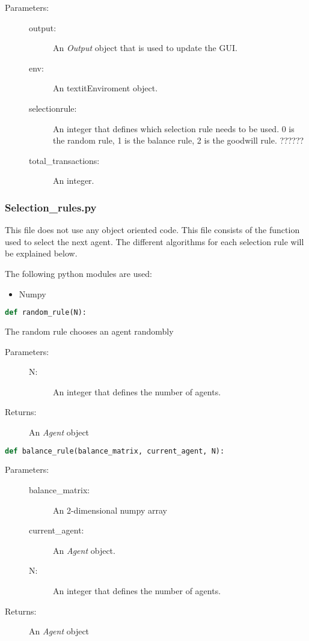 \documentclass{article}
\begin{document}
\begin{description}
  \item[Parameters:] \hfill
	\begin{description}
  		\item[output:] An \textit{Output} object that is used to update the GUI.
		\item[env:] An textit{Enviroment} object.
		\item[selectionrule:]  An integer that defines which selection rule needs to be used. 0 is the random rule, 1 is the balance rule, 2 is the goodwill rule. ??????
		\item[total\_transactions:] An integer.
	\end{description}
\end{description}

\subsubsection{Selection\_rules.py}
This file does not use any object oriented code. This file consists of the function used to select the next agent. The different algorithms for each selection rule will be explained below.

The following python modules are used:
\begin{itemize}
  \item Numpy
\end{itemize}

\begin{lstlisting}[language=Python]
def random_rule(N):
\end{lstlisting}
The random rule chooses an agent randombly

\begin{description}
  \item[Parameters:] \hfill
	\begin{description}
  		\item[N:] An integer that defines the number of agents.
	\end{description}
  \item[Returns:] An \textit{Agent} object
\end{description}

\begin{lstlisting}[language=Python]
def balance_rule(balance_matrix, current_agent, N):
\end{lstlisting}

\begin{description}
  \item[Parameters:] \hfill
	\begin{description}
  		\item[balance\_matrix:] An 2-dimensional numpy array
		\item[current\_agent:] An \textit{Agent} object.
		\item[N:] An integer that defines the number of agents.
	\end{description}
  \item[Returns:] An \textit{Agent} object
\end{description}
\end{document}
